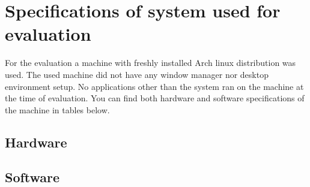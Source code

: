\chapter{Specifications of system used for evaluation}\label{app:specs}

For the evaluation a machine with freshly installed Arch linux distribution was used.
The used machine did not have any window manager nor desktop environment setup.
No applications other than the system ran on the machine at the time of evaluation.
You can find both hardware and software specifications of the machine in tables below.

\section{Hardware}

{
\begin{table}[h!]
\end{table}
}

\section{Software}

{
\begin{table}[h!]
\end{table}
}
